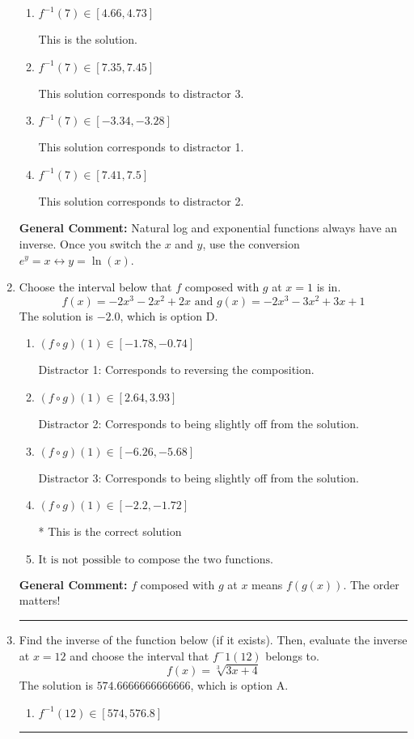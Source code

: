 \documentclass{extbook}[14pt]
\newcommand{\litem}[1]{\item #1

\rule{\textwidth}{0.4pt}}
\begin{document}
\begin{enumerate}
{\begin{enumerate}[label=\Alph*.]
 This solution corresponds to distractor 4.
\item \( f^{-1}(7) \in [4.66, 4.73] \)

 This is the solution.
\item \( f^{-1}(7) \in [7.35, 7.45] \)

 This solution corresponds to distractor 3.
\item \( f^{-1}(7) \in [-3.34, -3.28] \)

 This solution corresponds to distractor 1.
\item \( f^{-1}(7) \in [7.41, 7.5] \)

 This solution corresponds to distractor 2.
\end{enumerate}

\textbf{General Comment:} Natural log and exponential functions always have an inverse. Once you switch the $x$ and $y$, use the conversion $ e^y = x \leftrightarrow y=\ln(x)$.
}
\litem{
Choose the interval below that $f$ composed with $g$ at $x=1$ is in.
\[ f(x) = -2x^{3} -2 x^{2} +2 x \text{ and } g(x) = -2x^{3} -3 x^{2} +3 x + 1 \]The solution is \( -2.0 \), which is option D.\begin{enumerate}[label=\Alph*.]
\item \( (f \circ g)(1) \in [-1.78, -0.74] \)

 Distractor 1: Corresponds to reversing the composition.
\item \( (f \circ g)(1) \in [2.64, 3.93] \)

 Distractor 2: Corresponds to being slightly off from the solution.
\item \( (f \circ g)(1) \in [-6.26, -5.68] \)

 Distractor 3: Corresponds to being slightly off from the solution.
\item \( (f \circ g)(1) \in [-2.2, -1.72] \)

* This is the correct solution
\item \( \text{It is not possible to compose the two functions.} \)


\end{enumerate}

\textbf{General Comment:} $f$ composed with $g$ at $x$ means $f(g(x))$. The order matters!
}
\litem{
Find the inverse of the function below (if it exists). Then, evaluate the inverse at $x = 12$ and choose the interval that $f^-1(12)$ belongs to.
\[ f(x) = \sqrt[3]{3 x + 4} \]The solution is \( 574.6666666666666 \), which is option A.\begin{enumerate}[label=\Alph*.]
\item \( f^{-1}(12) \in [574, 576.8] \)


\end{enumerate}}
\end{enumerate}
\end{document}
